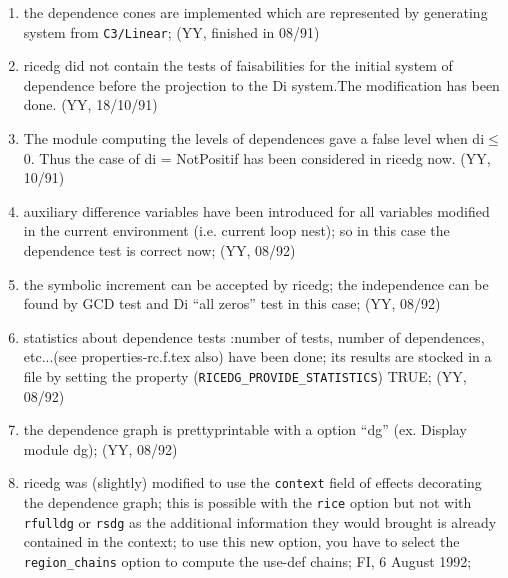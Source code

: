 \begin{enumerate}

  \item the dependence cones are implemented which are represented by 
        generating system from \verb+C3/Linear+; (YY, finished in 08/91)

  \item ricedg did not contain the tests of faisabilities for the
        initial system of dependence before the projection to the Di system.The
        modification has been done.  (YY, 18/10/91) 

  \item The module computing
        the levels of dependences gave a false level when di$\leq$0. 
        Thus the case
        of di = NotPositif has been considered in ricedg now.  (YY, 10/91)

  \item auxiliary difference variables have been introduced for all
        variables modified in the current environment (i.e. current
        loop nest); so in this case the dependence test is correct now;
        (YY, 08/92)

  \item the symbolic increment can be accepted by ricedg; the
        independence can be found by GCD test and Di ``all zeros'' test
        in this case; (YY, 08/92) 

  \item statistics 
        about dependence tests :number of tests, number of dependences, etc...(see
        properties-rc.f.tex also) have been done; its results are stocked
        in a file by setting the property (\verb+RICEDG_PROVIDE_STATISTICS+) TRUE;   
        (YY, 08/92)

  \item the dependence graph is prettyprintable with a option ``dg''
        (ex. Display module dg); (YY, 08/92)

  \item ricedg was (slightly) modified to use the \verb+context+ field 
        of effects decorating the dependence graph; this is possible
        with the \verb+rice+ option but not with \verb+rfulldg+ or
        \verb+rsdg+ as the additional information they would brought
        is already contained in the context; to use this new option,
        you have to select the  \verb+region_chains+ option to compute
        the use-def chains; FI, 6 August 1992;

\end{enumerate}

